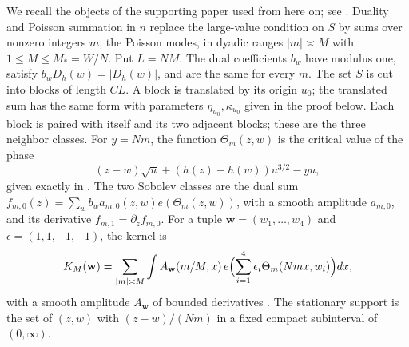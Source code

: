 \documentclass[11pt]{amsart}
\numberwithin{equation}{section}
\begin{document}
We recall the objects of the supporting paper used from here on; see
\cite[Section~\ref*{six-sec:signed} and
Appendix~\ref*{six-app:dualityproof}]{Weighted}.
Duality and Poisson summation in $n$ replace the large-value condition
on $S$ by sums over nonzero integers $m$, the Poisson modes, in dyadic
ranges $|m|\asymp M$ with $1\le M\le M_*=W/N$. Put $L=NM$.
The dual coefficients $b_w$ have modulus one, satisfy
$b_wD_h(w)=|D_h(w)|$, and are the same for every $m$.
The set $S$ is cut into blocks of length $CL$. A block is translated by
its origin $u_0$; the translated sum has the same form with parameters
$\eta_{u_0},\kappa_{u_0}$ given in the proof below. Each block is paired
with itself and its two adjacent blocks; these are the three neighbor
classes.
For $y=Nm$, the function $\Theta_m(z,w)$ is the critical value of the
phase
\[
 (z-w)\sqrt u+(h(z)-h(w))u^{3/2}-yu,
\]
given exactly in \cite[Lemma~\ref*{six-lem:phase}]{Weighted}.
The two Sobolev classes are the dual sum
$f_{m,0}(z)=\sum_wb_wa_{m,0}(z,w)e(\Theta_m(z,w))$, with a smooth
amplitude $a_{m,0}$, and its derivative
$f_{m,1}=\partial_zf_{m,0}$. For a tuple $\mathbf w=(w_1,\ldots,w_4)$
and $\epsilon=(1,1,-1,-1)$, the kernel is
\[
 K_M(\mathbf w)=\sum_{|m|\asymp M}\int A_{\mathbf w}(m/M,x)\,
 e\Bigl(\sum_{i=1}^4\epsilon_i\Theta_m(Nmx,w_i)\Bigr)dx,
\]
with a smooth amplitude $A_{\mathbf w}$ of bounded derivatives
\cite[(\ref*{six-eq:tuple})]{Weighted}. The stationary support is the
set of $(z,w)$ with $(z-w)/(Nm)$ in a fixed compact subinterval of
$(0,\infty)$.
\end{document}
